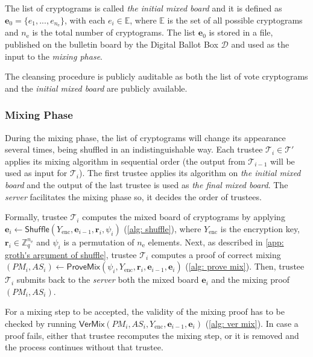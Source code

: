 The list of cryptograms is called \textit{the initial mixed board} and it is defined as $\boldsymbol{e}_0 = \{ e_1, ..., e_{n_\mathrm{e}} \}$, with each $e_i \in \mathbb{E}$, where $\mathbb{E}$ is the set of all possible cryptograms and $n_\mathrm{e}$ is the total number of cryptograms. The list $\boldsymbol{e}_0$ is stored in a file, published on the bulletin board by the Digital Ballot Box $\mathcal{D}$ and used as the input to the \textit{mixing phase}.

The cleansing procedure is publicly auditable as both the list of vote cryptograms and the \textit{initial mixed board} are publicly available.


\subsubsection{Mixing Phase} \label{sec: mixing phase}
During the mixing phase, the list of cryptograms will change its appearance several times, being shuffled in an indistinguishable way. Each trustee \( \mathcal{T}_i \in \boldsymbol{\mathcal{T}'} \) applies its mixing algorithm in sequential order (the output from $\mathcal{T}_{i-1}$ will be used as input for $\mathcal{T}_i$). The first trustee applies its algorithm on \textit{the initial mixed board} and the output of the last trustee is used as \textit{the final mixed board}. The \textit{server} facilitates the mixing phase so, it decides the order of trustees.

Formally, trustee $\mathcal{T}_i$ computes the mixed board of cryptograms by applying $\boldsymbol{e}_i \gets \mathsf{Shuffle}(Y_\mathrm{enc}, \boldsymbol{e}_{i-1}, \boldsymbol{r}_i, \psi_i)$ (\cref{alg: shuffle}), where $Y_\mathrm{enc}$ is the encryption key, $\boldsymbol{r}_i \in \mathbb{Z}_q^{n_\mathrm{e}}$ and $\psi_i$ is a permutation of $n_\mathrm{e}$ elements. Next, as described in \cref{app: groth's argument of shuffle}, trustee $\mathcal{T}_i$ computes a proof of correct mixing $(PM_i, AS_i) \gets \mathsf{ProveMix}(\psi_i, Y_\mathrm{enc}, \boldsymbol{r}_i, \boldsymbol{e}_{i-1}, \boldsymbol{e}_i)$ (\cref{alg: prove mix}). Then, trustee $\mathcal{T}_i$ submits back to the \textit{server} both the mixed board $\boldsymbol{e}_i$ and the mixing proof $(PM_i, AS_i)$.

For a mixing step to be accepted, the validity of the mixing proof has to be checked by running $\mathsf{VerMix}(PM_i, AS_i, Y_\mathrm{enc}, \boldsymbol{e}_{i-1}, \boldsymbol{e}_i)$ (\cref{alg: ver mix}). In case a proof fails, either that trustee recomputes the mixing step, or it is removed and the process continues without that trustee.

